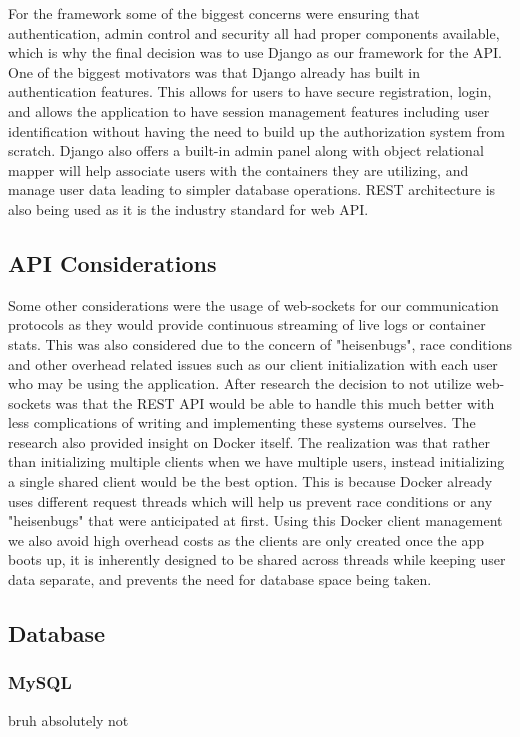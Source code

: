 \documentclass[12pt]{article}
\begin{document}
For the framework some of the biggest concerns were ensuring that authentication, admin control and security all had proper components available, which is why the final decision was to use Django as our framework for the API. One of the biggest motivators was that Django already has built in authentication features. This allows for users to have secure registration, login, and allows the application to have session management features including user identification without having the need to build up the authorization system from scratch. Django also offers a built-in admin panel along with object relational mapper will help associate users with the containers they are utilizing, and manage user data leading to simpler database operations. REST architecture is also being used as it is the industry standard for web API.

\subsection{API Considerations}
Some other considerations were the usage of web-sockets for our communication protocols as they would provide continuous streaming of live logs or container stats. This was also considered due to the concern of "heisenbugs", race conditions and other overhead related issues such as our client initialization with each user who may be using the application. After research the decision to not utilize web-sockets was that the REST API would be able to handle this much better with less complications of writing and implementing these systems ourselves. The research also provided insight on Docker itself. The realization was that rather than initializing multiple clients when we have multiple users, instead initializing a single shared client would be the best option. This is because Docker already uses different request threads which will help us prevent race conditions or any "heisenbugs" that were anticipated at first. Using this Docker client management we also avoid high overhead costs as the clients are only created once the app boots up, it is inherently designed to be shared across threads while keeping user data separate, and prevents the need for database space being taken.

\subsection{Database}

\subsubsection{MySQL}
bruh absolutely not
\end{document}
